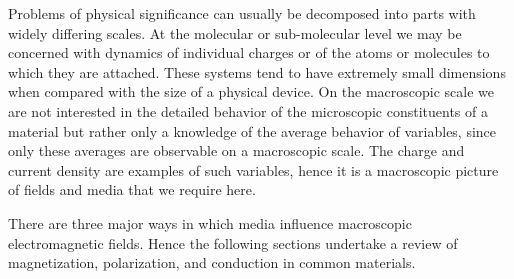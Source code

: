\documentclass[11pt,a4paper,oneside]{book}
\numberwithin{equation}{section}
\theoremstyle{it}
\theoremstyle{definition}
\begin{document}
Problems of physical significance can usually be decomposed into parts with widely differing scales. At the molecular or sub-molecular level we may be concerned with dynamics of individual charges or of the atoms or molecules to which they are attached. These systems tend to have extremely small dimensions when  compared with the size of a physical device. On the macroscopic scale we are not interested in the detailed behavior of the microscopic constituents of a material but rather only a knowledge of the average behavior of variables, since only these averages are observable on a macroscopic scale. The charge and current density are examples of such variables, hence it is a macroscopic picture of fields and media that we require here.

There are three major ways in which media influence macroscopic electromagnetic fields. Hence the following sections undertake a review of magnetization, polarization, and conduction in common materials.
\end{document}
